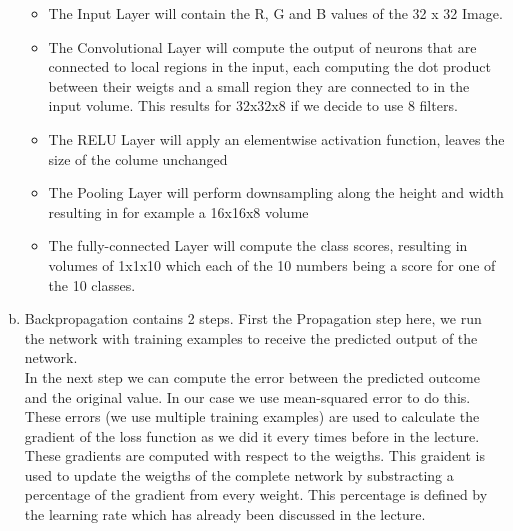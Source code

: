\documentclass[12pt]{article}
\begin{document}
\begin{enumerate}[a)]
        \begin{itemize}
            \item 
                The Input Layer will contain the R, G and B values of the 32 x 32 Image. 
            \item
                The Convolutional Layer will compute the output of neurons that are connected to local regions in the input, each computing the dot product between their weigts and a small region they are connected to in the input volume. This results for 32x32x8 if we decide to use 8 filters.
            \item
                The RELU Layer will apply an elementwise activation function, leaves the size of the colume unchanged
            \item
                The Pooling Layer will perform downsampling along the height and width resulting in for example a 16x16x8 volume
            \item
                The fully-connected Layer will compute the class scores, resulting in volumes of 1x1x10 which each of the 10 numbers being a score for one of the 10 classes.
        \end{itemize}
    \item
    	Backpropagation contains 2 steps. First the Propagation step here, we run the network with training examples to receive the predicted output of the network. \\
    	In the next step we can compute the error between the predicted outcome and the original value. In our case we use mean-squared error to do this.\\
    	These errors (we use multiple training examples) are used to calculate the gradient of the loss function as we did it every times before in the lecture.\\
    	These gradients are computed with respect to the weigths. This graident is used to update the weigths of the complete network by substracting a percentage of the gradient from every weight. This percentage is defined by the learning rate which has already been discussed in the lecture.
    	\newpage

\end{enumerate}
\end{document}
